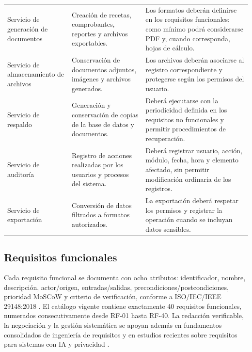 \documentclass[11pt,a4paper]{article}
\begin{document}
\begin{longtable}{p{} p{} p{}}
		Servicio de generación de documentos &
		Creación de recetas, comprobantes, reportes y archivos exportables. &
		Los formatos deberán definirse en los requisitos funcionales; como mínimo podrá
		considerarse PDF y, cuando corresponda, hojas de cálculo. \\
		
		Servicio de almacenamiento de archivos &
		Conservación de documentos adjuntos, imágenes y archivos generados. &
		Los archivos deberán asociarse al registro correspondiente y protegerse según
		los permisos del usuario. \\
		
		Servicio de respaldo &
		Generación y conservación de copias de la base de datos y documentos. &
		Deberá ejecutarse con la periodicidad definida en los requisitos no funcionales
		y permitir procedimientos de recuperación. \\
		
		Servicio de auditoría &
		Registro de acciones realizadas por los usuarios y procesos del sistema. &
		Deberá registrar usuario, acción, módulo, fecha, hora y elemento afectado, sin
		permitir modificación ordinaria de los registros. \\
		
		Servicio de exportación &
		Conversión de datos filtrados a formatos autorizados. &
		La exportación deberá respetar los permisos y registrar la operación cuando se
		incluyan datos sensibles. \\
		
	\end{longtable}
	
	\subsection{ Requisitos funcionales}
	
	Cada requisito funcional se documenta con ocho atributos: identificador, nombre, descripción, actor/origen, entradas/salidas, precondiciones/postcondiciones, prioridad MoSCoW y criterio de verificación, conforme a ISO/IEC/IEEE 29148:2018 \cite{iso29148}. El catálogo vigente contiene exactamente 40 requisitos funcionales, numerados consecutivamente desde RF-01 hasta RF-40. La redacción verificable, la negociación y la gestión sistemática se apoyan además en fundamentos consolidados de ingeniería de requisitos \cite{davis1993,nuseibeh2000,pohl2010} y en estudios recientes sobre requisitos para sistemas con IA y privacidad \cite{ahmad2023,habiba2024,negriribalta2024,herwanto2024}.
	
\end{document}
